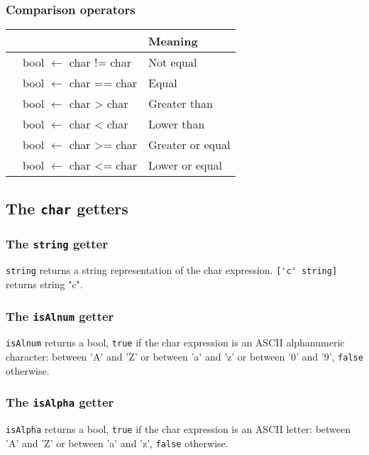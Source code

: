 \documentclass[10pt,openright,twosides]{report}
\newcommand{\ccst}[1]{{\footnotesize\ttfamily\colorbox{light-blue}{'#1'}}}
\newcommand{\scst}[1]{{\footnotesize\ttfamily\colorbox{light-blue}{"#1"}}}
\newcommand{\gtlinline}[1]{\colorbox{light-blue}{\lstinline[language=gtl]{#1}}}
\begin{document}
\subsubsection{Comparison operators}

\begin{longtable}{>{\ttfamily}l|>{\ttfamily}l|l}
{\bf Operator}&{\bf Expression type}&{\bf Meaning}\\
\hline\endhead
 {!=}&
  {bool $\leftarrow$ char != char}&
  {Not equal}\\
 {==}&
  {bool $\leftarrow$ char == char}&
  {Equal}\\
 {>}&
  {bool $\leftarrow$ char > char}&
  {Greater than}\\
 {<}&
  {bool $\leftarrow$ char < char}&
  {Lower than}\\
 {>=}&
  {bool $\leftarrow$ char >= char}&
  {Greater or equal}\\
 {<=}&
  {bool $\leftarrow$ char <= char}&
  {Lower or equal}\\
\end{longtable}

\subsection{The \texttt{char} getters}

\subsubsection{The \texttt{string} getter}

\gtlinline{string} returns a string representation of the char expression. \gtlinline{['c' string]} returns string \scst{c}.

\subsubsection{The \texttt{isAlnum} getter}

\gtlinline{isAlnum} returns a bool, \gtlinline{true} if the char expression is an ASCII alphanumeric character: between \ccst{A} and \ccst{Z} or between \ccst{a} and \ccst{z} or between \ccst{0} and \ccst{9}, \gtlinline{false} otherwise.

\subsubsection{The \texttt{isAlpha} getter}

\gtlinline{isAlpha} returns a bool, \gtlinline{true} if the char expression is an ASCII letter: between \ccst{A} and \ccst{Z} or between \ccst{a} and \ccst{z}, \gtlinline{false} otherwise.
\end{document}
